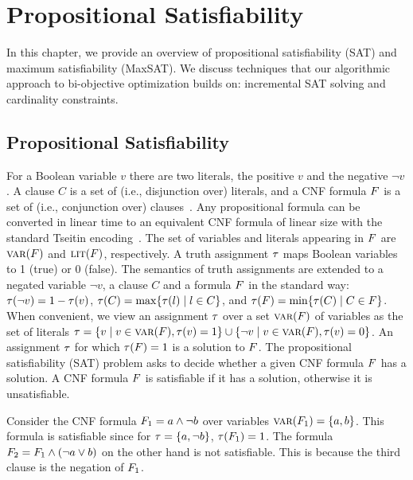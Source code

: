 \chapter{Propositional Satisfiability\label{chap:satisfiability}}

In this chapter, we provide an overview of propositional satisfiability (SAT) and maximum satisfiability  (MaxSAT).
We discuss techniques that our algorithmic approach to bi-objective optimization builds on: incremental SAT solving and cardinality constraints.

\section{Propositional Satisfiability\label{sec:sat}}

For a Boolean variable $v$ there are two literals, the positive $v$ and the negative $\lnot v$. 
A clause $C$ is a set of (i.e., disjunction over) literals, and a CNF formula $F$ is a set of (i.e., conjunction over) clauses~\autocite{handbook2-cnf}.
Any propositional formula can be converted in linear time to an equivalent CNF formula of linear size with the standard Tseitin encoding~\autocites{handbook2-cnf,Tseitin1983ComplexityDerivationPropositional}.
The set of variables and literals appearing in $F$ are $\textsc{var}(F)$ and $\textsc{lit}(F)$, respectively.  
A truth assignment $\tau$ maps Boolean variables to 1 (true) or 0 (false).
The semantics of truth assignments are extended to a negated variable $\lnot v$, a clause $C$ and a formula $F$ in the standard way:
$\tau(\lnot v) = 1 - \tau(v)$, $\tau(C) = \max\{ \tau(l) \mid l \in C\}$, and $\tau(F) = \min\{\tau(C) \mid C \in F\}$.
When convenient, we view an assignment $\tau$ over a set $\textsc{var}(F)$ of variables as the set of literals $\tau = \{ v \mid v \in \textsc{var}(F),  \tau(v) = 1\} \cup \{ \lnot v \mid v \in \textsc{var}(F), \tau(v) = 0\}$.
An assignment $\tau$ for which $\tau(F) = 1$ is a solution to $F$.
The propositional satisfiability (SAT) problem asks to decide whether a given CNF formula $F$ has a solution.
A CNF formula $F$ is satisfiable if it has a solution, otherwise it is unsatisfiable.

\begin{example}
  Consider the CNF formula $F_1 = a \land \lnot b$ over variables $\textsc{var}(F_1) = \{a,b\}$.
  This formula is satisfiable since for $\tau=\{a,\lnot b\}$, $\tau(F_1)=1$.
  The formula $F_2 = F_1 \land (\lnot a \lor b)$ on the other hand is not satisfiable.
  This is because the third clause is the negation of $F_1$.
\end{example}

